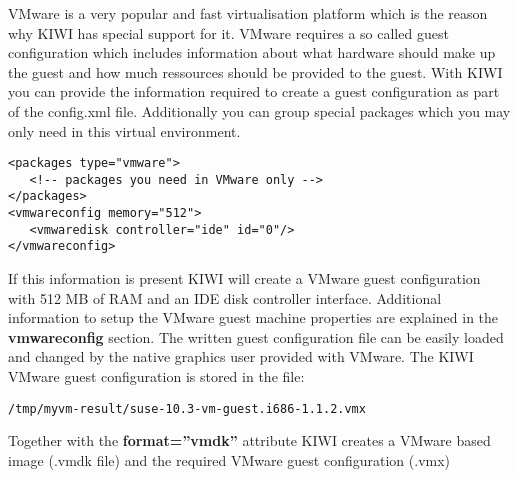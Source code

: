 VMware is a very popular and fast virtualisation platform which is
the reason why KIWI has special support for it. VMware requires a
so called guest configuration which includes information about what
hardware should make up the guest and how much ressources should be
provided to the guest. With KIWI you can provide the information
required to create a guest configuration as part of the config.xml
file. Additionally you can group special packages which you may only
need in this virtual environment.

\begin{Command}{13cm}
\begin{verbatim}
<packages type="vmware">
   <!-- packages you need in VMware only -->
</packages>
<vmwareconfig memory="512">
   <vmwaredisk controller="ide" id="0"/>
</vmwareconfig>
\end{verbatim}
\end{Command}

If this information is present KIWI will create a VMware guest
configuration with 512 MB of RAM and an IDE disk controller interface.
Additional information to setup the VMware guest machine properties are
explained in the \textbf{vmwareconfig} section. The written guest
configuration file can be easily loaded and changed by the native
graphics user provided with VMware. The KIWI VMware guest configuration
is stored in the file:

\begin{Command}{13cm}
\begin{verbatim}
/tmp/myvm-result/suse-10.3-vm-guest.i686-1.1.2.vmx
\end{verbatim}
\end{Command}

Together with the \textbf{format=''vmdk''} attribute KIWI creates
a VMware based image (.vmdk file) and the required VMware guest
configuration (.vmx)
